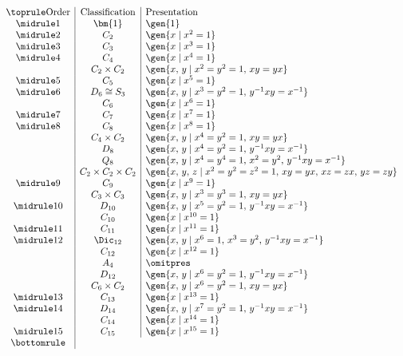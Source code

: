 
\begin{displaymath}
\begin{array}{c|c|l}
\toprule
\text{Order} & \text{Classification} & \text{Presentation} \\
\midrule
1 & \bm{1} & \gen{1} \\
\midrule
2 & C_2 & \gen{x \mid x^2 = 1} \\
\midrule
3 & C_3 & \gen{x \mid x^3 = 1} \\
\midrule
4 & C_4 & \gen{x \mid x^4 = 1} \\
  & C_2 \times C_2 & \gen{x,\,y \mid x^2 = y^2 = 1,\, xy = yx} \\
\midrule
5 & C_5 & \gen{x \mid x^5 = 1} \\
\midrule
6 & D_6 \cong S_3 & \gen{x,\,y \mid x^3 = y^2 = 1,\, y^{-1}xy = x^{-1}} \\
  & C_6 & \gen{x \mid x^6 = 1} \\
\midrule
7 & C_7 & \gen{x \mid x^7 = 1} \\
\midrule
8 & C_8 & \gen{x \mid x^8 = 1} \\
  & C_4 \times C_2 & \gen{x,\,y \mid x^4 = y^2 = 1,\, xy = yx} \\
  & D_8 & \gen{x,\,y \mid x^4 = y^2 = 1,\, y^{-1}xy = x^{-1}} \\
  & Q_8 & \gen{x,\,y \mid x^4 = y^4 = 1,\, x^2 = y^2,\, y^{-1}xy = x^{-1}} \\
  & C_2 \times C_2 \times C_2 & \gen{x,\,y,\,z \mid x^2 = y^2 = z^2 = 1,\, xy = yx,\, xz = zx,\, yz = zy} \\
\midrule
9 & C_9 & \gen{x \mid x^9 = 1} \\
  & C_3 \times C_3 & \gen{x,\,y \mid x^3 = y^3 = 1,\, xy = yx} \\
\midrule
10 & D_{10} & \gen{x,\,y \mid x^5 = y^2 = 1,\, y^{-1}xy = x^{-1}} \\
   & C_{10} & \gen{x \mid x^{10} = 1} \\
\midrule
11 & C_{11} & \gen{x \mid x^{11} = 1} \\
\midrule
12 & \Dic_{12} & \gen{x,\,y \mid x^6 = 1,\, x^3 = y^2,\, y^{-1}xy = x^{-1}} \\
   & C_{12} & \gen{x \mid x^{12} = 1} \\
   & A_4 & {\omitpres} \\ %
   & D_{12} & \gen{x,\,y \mid x^6 = y^2 = 1,\, y^{-1}xy = x^{-1}} \\
   & C_6 \times C_2 & \gen{x,\,y \mid x^6 = y^2 = 1,\, xy = yx} \\
\midrule
13 & C_{13} & \gen{x \mid x^{13} = 1} \\
\midrule
14 & D_{14} & \gen{x,\,y \mid x^7 = y^2 = 1,\, y^{-1}xy = x^{-1}} \\
   & C_{14} & \gen{x \mid x^{14} = 1} \\
\midrule
15 & C_{15} & \gen{x \mid x^{15} = 1} \\
\bottomrule
\end{array}
\end{displaymath}
\vfill
\pagebreak

